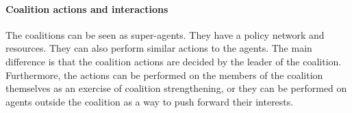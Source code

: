 \paragraph{Coalition actions and interactions}

The coalitions can be seen as super-agents. They have a policy network and resources. They can also perform similar actions to the agents. The main difference is that the coalition actions are decided by the leader of the coalition. Furthermore, the actions can be performed on the members of the coalition themselves as an exercise of coalition strengthening, or they can be performed on agents outside the coalition as a way to push forward their interests.

